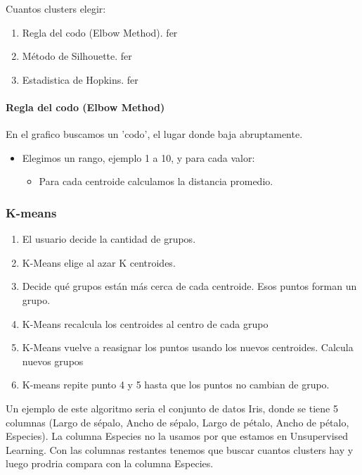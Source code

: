 \documentclass[../main.tex]{subfiles}
\begin{document}
        Cuantos clusters elegir:
        \begin{enumerate}
            \item Regla del codo (Elbow Method). fer
            \item Método de Silhouette. fer 
            \item Estadistica de Hopkins. fer
        \end{enumerate}
        
        \paragraph{Regla del codo (Elbow Method)}
            En el grafico buscamos un 'codo', el lugar donde baja abruptamente.
            \begin{itemize}
                \item Elegimos un rango, ejemplo 1 a 10, y para cada valor:
                    \begin{itemize}
                        \item Para cada centroide calculamos la distancia promedio.
                    \end{itemize}
            \end{itemize}
    \subsubsection{K-means}
        \begin{enumerate}
            \item El usuario decide la cantidad de grupos.
            \item K-Means elige al azar K centroides.
            \item Decide qué grupos están más cerca de cada centroide. Esos puntos forman un grupo.
            \item K-Means recalcula los centroides al centro de cada grupo		
            \item K-Means vuelve a reasignar los puntos usando los nuevos centroides. Calcula nuevos grupos
            \item K-means repite punto 4 y 5 hasta que los puntos no cambian de grupo. 
        \end{enumerate}
		 
        Un ejemplo de este algoritmo seria el conjunto de datos Iris, donde se tiene 5 columnas (Largo de sépalo, Ancho de sépalo, Largo de pétalo, Ancho de pétalo, Especies). La columna Especies no la usamos por que estamos en Unsupervised Learning. Con las columnas restantes tenemos que buscar cuantos clusters hay y luego prodria compara con la columna Especies.
	
\end{document}
